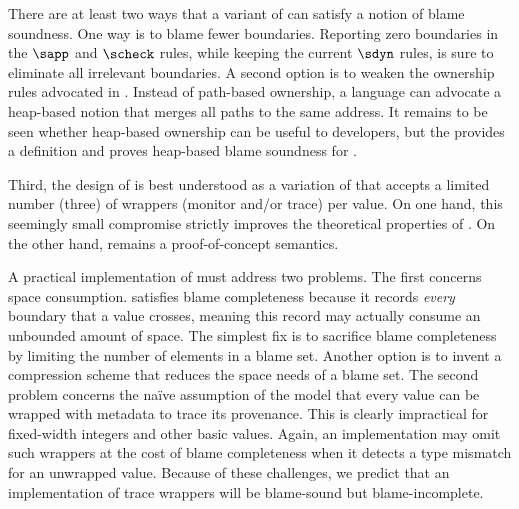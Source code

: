 There are at least two ways that a variant of \Tname{} can satisfy a notion
 of blame soundness.
One way is to blame fewer boundaries.
Reporting zero boundaries in the $\sapp$ and $\scheck$ rules, while keeping
 the current $\sdyn$ rules, is sure to eliminate all irrelevant boundaries.
A second option is to weaken the ownership rules advocated in .
Instead of path-based ownership, a language can advocate a heap-based notion
 that merges all paths to the same address.
It remains to be seen whether heap-based ownership can be useful to developers,
 but the \techreport{} provides a definition and proves heap-based blame soundness
 for \Tname{}.


Third, the design of \Aname{} is best understood as a variation of
\Tname{} that accepts a limited number (three) of wrappers (monitor and/or
trace) per value.  On one hand, this seemingly small compromise strictly
improves the theoretical properties of \Tname{}. On the other hand,
\Aname{} remains a proof-of-concept semantics.

A practical implementation of \Aname{} must address two problems.
The first concerns space consumption.
\Aname{} satisfies blame completeness
because it records {\em every\/} boundary that a value crosses, meaning this record
may actually consume an unbounded amount of space.  The simplest fix is to
sacrifice blame completeness by limiting the number of elements in a blame set.
Another option is to invent a compression scheme that reduces the space
needs of a blame set.
The second problem concerns the na{\"i}ve assumption of the model that every
value can be wrapped with metadata to trace its provenance. This is clearly
impractical for fixed-width integers and other basic values.  Again, an
implementation may omit such wrappers at the cost of blame completeness
when it detects a type mismatch for an unwrapped value.
Because of these challenges, we predict
that an implementation of trace wrappers will be
blame-sound but blame-incomplete.
